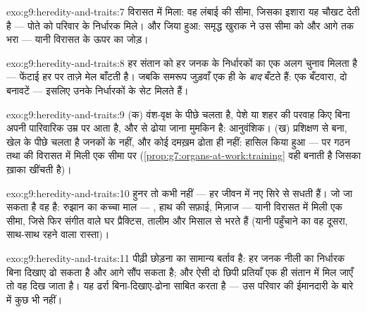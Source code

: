 \begin{solution}{exo:g9:heredity-and-traits:7}
विरासत में मिला: वह लंबाई की सीमा, जिसका इशारा यह चौखट देती है ---
पोते को परिवार के निर्धारक मिले। और जिया हुआ: समृद्ध खुराक ने उस सीमा को
और आगे तक भरा --- यानी विरासत के ऊपर  का जोड़।
\end{solution}

\begin{solution}{exo:g9:heredity-and-traits:8}
हर संतान को हर जनक के निर्धारकों का एक अलग चुनाव मिलता है --- फेंटाई हर
 पर ताज़े मेल बाँटती है। जबकि समरूप जुड़वाँ एक ही  के
\emph{बाद} बँटते हैं: एक बँटवारा, दो बनावटें --- इसलिए उनके निर्धारकों
के सेट मिलते हैं।
\end{solution}

\begin{solution}{exo:g9:heredity-and-traits:9}
(क) वंश-वृक्ष के पीछे चलता है, पेशे या शहर की परवाह किए बिना अपनी
पारिवारिक उम्र पर आता है, और  से ढोया जाना मुमकिन है: आनुवंशिक।
(ख) प्रशिक्षण से बना, खेल के पीछे चलता है जनकों के नहीं, और कोई 
दमख़म ढोता ही नहीं: हासिल किया हुआ --- पर गठन तथा  की विरासत में मिली
एक सीमा पर (\cref{prop:g7:organs-at-work:training} वही बनाती है जिसका
ख़ाका  खींचती है)।
\end{solution}

\begin{solution}{exo:g9:heredity-and-traits:10}
हुनर तो कभी नहीं ---  हर जीवन में नए सिरे से सधती हैं। जो
जा सकता है वह है: रुझान का कच्चा माल --- , हाथ की सफ़ाई, मिज़ाज ---
यानी विरासत में मिली एक सीमा, जिसे फिर संगीत वाले घर प्रैक्टिस, तालीम और
मिसाल से भरते हैं (यानी पहुँचाने का वह दूसरा, साथ-साथ रहने वाला रास्ता)।
\end{solution}

\begin{solution}{exo:g9:heredity-and-traits:11}
पीढ़ी छोड़ना  का सामान्य बर्ताव है: हर जनक नीली  का निर्धारक
बिना दिखाए ढो सकता है और आगे सौंप सकता है; और ऐसी दो छिपी प्रतियाँ एक ही
संतान में मिल जाएँ तो वह  दिख जाता है। यह ढर्रा बिना-दिखाए-ढोना
साबित करता है --- उस परिवार की ईमानदारी के बारे में कुछ भी नहीं।
\end{solution}

